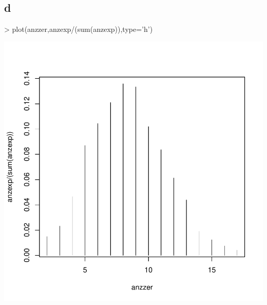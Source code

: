 \subsection{d}
\begin{Schunk}
\begin{Sinput}
> plot(anzzer,anzexp/(sum(anzexp)),type='h')
\end{Sinput}
\end{Schunk}
\includegraphics{sw10_1-005}


